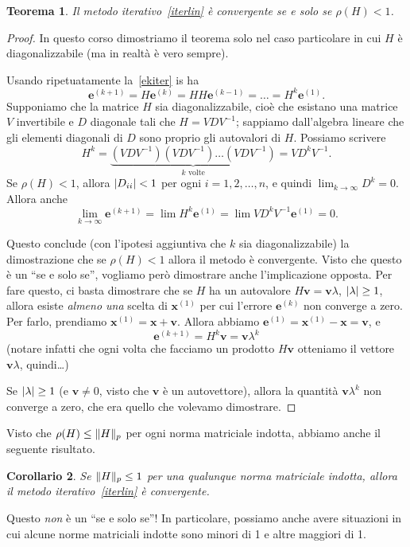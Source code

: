 \documentclass[a4paper]{report}
\DeclarePairedDelimiter{\abs}{\lvert}{\rvert}
\DeclarePairedDelimiter{\norm}{\lVert}{\rVert}
\newtheorem{theorem}{Teorema}[chapter]
\newtheorem{corollary}[theorem]{Corollario}
\theoremstyle{definiton}
\theoremstyle{remark}
\newcommand{\x}{\mathbf{x}}
\newcommand{\e}{\mathbf{e}}
\begin{document}
\begin{theorem}
Il metodo iterativo~\eqref{iterlin} è convergente se e solo se $\rho(H) < 1$.
\end{theorem}
\begin{proof}
In questo corso dimostriamo il teorema solo nel caso particolare in cui $H$ è diagonalizzabile (ma in realtà è vero sempre).

Usando ripetuatamente la~\eqref{ekiter} is ha
\[
\e^{(k+1)} = H\e^{(k)} = H H \e^{(k-1)} = \dots = H^{k} \e^{(1)}.
\]
Supponiamo che la matrice $H$ sia diagonalizzabile, cioè che esistano una matrice $V$ invertibile e $D$ diagonale tali che $H = VDV^{-1}$; sappiamo dall'algebra lineare che gli elementi diagonali di $D$ sono proprio gli autovalori di $H$. Possiamo scrivere
\[
H^k = \underbrace{(VDV^{-1})(VDV^{-1}) \dots (VDV^{-1})}_{\text{$k$ volte}} = VD^kV^{-1}.
\]
Se $\rho(H) < 1$, allora $\abs{D_{ii}} < 1$ per ogni $i=1,2,\dots,n$, e quindi $\lim_{k\to\infty} D^k = 0$. Allora anche
\[
\lim_{k\to\infty} \mathbf{e}^{(k+1)} = \lim H^k \mathbf{e}^{(1)} = \lim VD^k V^{-1} \mathbf{e}^{(1)} = 0.
\]

Questo conclude (con l'ipotesi aggiuntiva che $k$ sia diagonalizzabile) la dimostrazione che se $\rho(H)<1$ allora il metodo è convergente. Visto che questo è un ``se e solo se'', vogliamo però dimostrare anche l'implicazione opposta. Per fare questo, ci basta dimostrare che se $H$ ha un autovalore $H\mathbf{v} = \mathbf{v} \lambda$, $\abs{\lambda} \geq 1$, allora esiste \emph{almeno una} scelta di $\x^{(1)}$ per cui l'errore $\e^{(k)}$ non converge a zero. Per farlo, prendiamo $\x^{(1)} = \x + \mathbf{v}$. Allora abbiamo $\e^{(1)} = \x^{(1)} - \x = \mathbf{v}$, e 
\begin{equation} \label{nonconverge}
    \e^{(k+1)} = H^k \mathbf{v} = \mathbf{v} \lambda^k    
\end{equation}
(notare infatti che ogni volta che facciamo un prodotto $H\mathbf{v}$ otteniamo il vettore $\mathbf{v}\lambda$, quindi\dots)


Se $\abs{\lambda} \geq 1$ (e $\mathbf{v}\neq 0$, visto  che $\mathbf{v}$ è un autovettore), allora la quantità $\mathbf{v} \lambda^k$ non converge a zero, che era quello che volevamo dimostrare.
\end{proof}
Visto che $\rho(H) \leq \norm{H}_p$ per ogni norma matriciale indotta, abbiamo anche il seguente risultato.
\begin{corollary}
Se $\norm{H}_p \leq 1$ per una qualunque norma matriciale indotta, allora il metodo iterativo~\eqref{iterlin} è convergente.
\end{corollary}
Questo \emph{non} è un ``se e solo se''! In particolare, possiamo anche avere situazioni in cui alcune norme matriciali indotte sono minori di 1 e altre maggiori di 1.
\end{document}
